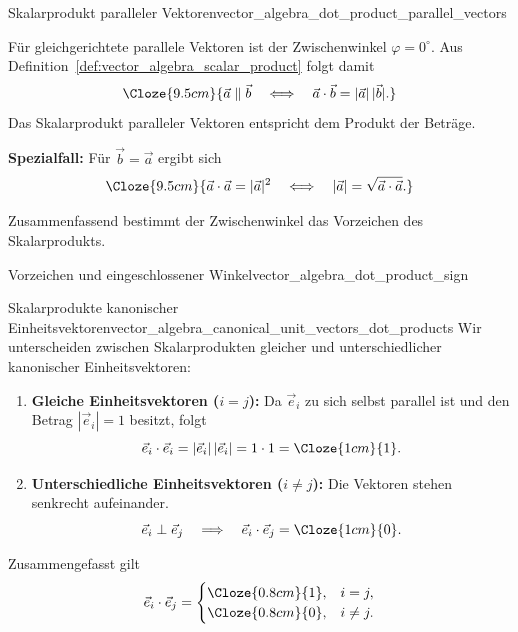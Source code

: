 \begin{KeyPointBox}{Skalarprodukt paralleler Vektoren}{vector_algebra_dot_product_parallel_vectors}
  \begin{minipage}[c]{0.68\linewidth}
    Für gleichgerichtete parallele Vektoren ist der Zwischenwinkel
    $\varphi=0^\circ$. Aus
    Definition~\ref{def:vector_algebra_scalar_product} folgt damit
    \[
      \Cloze{9.5cm}{%
        \vec a\parallel\vec b
        \quad \Longleftrightarrow \quad
        \vec a\cdot\vec b=|\vec a|\,|\vec b|.}
    \]
    Das Skalarprodukt paralleler Vektoren entspricht dem Produkt der Beträge. \\
  \end{minipage}\hfill
  \begin{minipage}[c]{0.27\linewidth}
    \centering
  \end{minipage}
    \textbf{Spezialfall:} Für $\vec b=\vec a$ ergibt sich
    \[
      \Cloze{9.5cm}{%
        \vec a\cdot\vec a=|\vec a|^2
        \quad\Longleftrightarrow\quad
        |\vec a|=\sqrt{\vec a\cdot\vec a}.}
    \]
\end{KeyPointBox}

Zusammenfassend bestimmt der Zwischenwinkel das Vorzeichen des Skalarprodukts.

\begin{KeyPointBox}{Vorzeichen und eingeschlossener Winkel}{vector_algebra_dot_product_sign}
  \begin{center}
  \end{center}
\end{KeyPointBox}

\begin{ExampleBox}{Skalarprodukte kanonischer Einheitsvektoren}{vector_algebra_canonical_unit_vectors_dot_products}
  Wir unterscheiden zwischen Skalarprodukten gleicher und unterschiedlicher kanonischer Einheitsvektoren:
  \begin{enumerate}[label=\alph*),leftmargin=*,itemsep=0.8em]
    \item \textbf{Gleiche Einheitsvektoren ($i=j$):}
      Da $\vec e_i$ zu sich selbst parallel ist und den Betrag
      $|\vec e_i|=1$ besitzt, folgt
      \[
        \vec e_i\cdot\vec e_i
          =|\vec e_i|\,|\vec e_i|
          =1\cdot1
          =\Cloze{1cm}{1}.
      \]
    \item \textbf{Unterschiedliche Einheitsvektoren ($i\ne j$):}
      Die Vektoren stehen senkrecht aufeinander.
      \[
        \vec e_i\perp\vec e_j
          \quad\Longrightarrow\quad
        \vec e_i\cdot\vec e_j=\Cloze{1cm}{0}.
      \]
  \end{enumerate}

  Zusammengefasst gilt
  \[
    \vec e_i\cdot\vec e_j
      =\begin{cases}
          \Cloze{0.8cm}{1},&i=j,\\
          \Cloze{0.8cm}{0},&i\ne j.
        \end{cases}
  \]
\end{ExampleBox}

